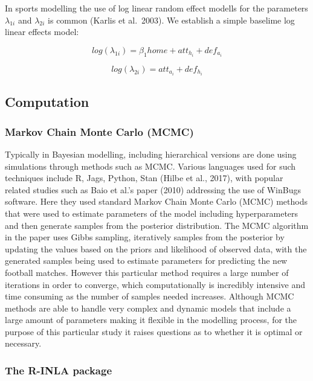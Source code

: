 \documentclass[
]{article}
\begin{document}
In sports modelling the use of log linear random effect modells for the
parameters \(\lambda_{1i}\) and \(\lambda_{2i}\) is common (Karlis et
al.~2003). We establish a simple baselime log linear effects model:

\[log(\lambda_{1i}) =  \beta_1 home + att_{h_i} + def_{a_i}  \]

\[log(\lambda_{2i}) =  att_{a_i} + def_{h_i}\]

\hypertarget{computation}{%
\subsection{Computation}\label{computation}}

\hypertarget{markov-chain-monte-carlo-mcmc}{%
\subsubsection{Markov Chain Monte Carlo
(MCMC)}\label{markov-chain-monte-carlo-mcmc}}

Typically in Bayesian modelling, including hierarchical versions are
done using simulations through methods such as MCMC. Various languages
used for such techniques include R, Jags, Python, Stan (Hilbe et al.,
2017), with popular related studies such as Baio et al.'s paper (2010)
addressing the use of WinBugs software. Here they used standard Markov
Chain Monte Carlo (MCMC) methods that were used to estimate parameters
of the model including hyperparameters and then generate samples from
the posterior distribution. The MCMC algorithm in the paper uses Gibbs
sampling, iteratively samples from the posterior by updating the values
based on the priors and likelihood of observed data, with the generated
samples being used to estimate parameters for predicting the new
football matches. However this particular method requires a large number
of iterations in order to converge, which computationally is incredibly
intensive and time consuming as the number of samples needed increases.
Although MCMC methods are able to handle very complex and dynamic models
that include a large amount of parameters making it flexible in the
modelling process, for the purpose of this particular study it raises
questions as to whether it is optimal or necessary.

\hypertarget{the-r-inla-package}{%
\subsubsection{The R-INLA package}\label{the-r-inla-package}}
\end{document}

